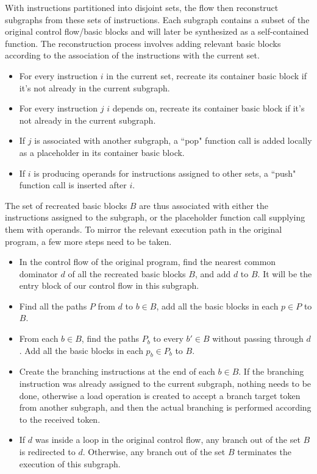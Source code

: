 With instructions partitioned into disjoint sets, the flow then
reconstruct subgraphs from these sets of instructions. Each subgraph
contains a subset of the original control flow/basic blocks and 
will later be synthesized as a self-contained function. The reconstruction process involves adding relevant basic blocks according to the
association of the instructions with the current set.
\begin{itemize}
    \item For every instruction $i$  in the current set, recreate
    its container basic block if it's not already in the current subgraph.
    \item For every instruction $j$  $i$ depends on, 
    recreate its container basic block if it's not already
    in the current subgraph.
    \item If $j$ is associated with another subgraph, a ``pop" function call
    is added locally as a placeholder in its container basic block.
    \item If $i$ is producing operands for instructions assigned to 
    other sets,  a ``push" function call is inserted after $i$.
\end{itemize}
The set of recreated basic blocks $B$ are thus associated with either the instructions
assigned to the subgraph, or the placeholder function call supplying them with operands. To mirror the relevant execution path in the original program, a few more steps need to be taken.
\begin{itemize}
    \item In the control flow of the original program, find the nearest common dominator $d$ of all the recreated basic blocks $B$, and add $d$ to $B$. It will be the entry block of our
    control flow in this subgraph.
    
    \item Find all the paths $P$ from $d$ to $b \in B$, add all the 
    basic blocks in each $p \in P$ to $B$.
    \item From each $b \in B$, find the paths $P_b$ to every $b' \in B$ without passing through $d$. Add all the basic blocks in each $p_b \in P_b$ to $B$. \item Create the branching instructions at the end of each $b \in B$. If the branching instruction was already assigned to the current subgraph, nothing needs to be done, otherwise a load operation is created to accept
    a branch target token from another subgraph, and then the actual branching is performed according to the received token. 
    \item If $d$ was inside a loop in the original control flow, any branch out of the set $B$ is redirected to $d$. Otherwise, any branch out of the set $B$ terminates the execution of this subgraph.
\end{itemize}


